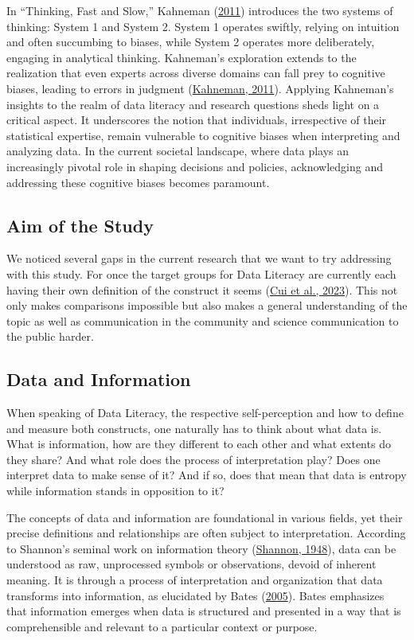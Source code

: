\documentclass[
  12pt,
  a4paper,
  twoside]{article}
\begin{document}
In ``Thinking, Fast and Slow,'' Kahneman (\protect\hyperlink{ref-kahneman2011}{2011}) introduces the two systems of thinking: System 1 and System 2. System 1 operates swiftly, relying on intuition and often succumbing to biases, while System 2 operates more deliberately, engaging in analytical thinking. Kahneman's exploration extends to the realization that even experts across diverse domains can fall prey to cognitive biases, leading to errors in judgment (\protect\hyperlink{ref-kahneman2011}{Kahneman, 2011}).
Applying Kahneman's insights to the realm of data literacy and research questions sheds light on a critical aspect. It underscores the notion that individuals, irrespective of their statistical expertise, remain vulnerable to cognitive biases when interpreting and analyzing data. In the current societal landscape, where data plays an increasingly pivotal role in shaping decisions and policies, acknowledging and addressing these cognitive biases becomes paramount.

\hypertarget{aim-of-the-study}{%
\subsection{Aim of the Study}\label{aim-of-the-study}}

We noticed several gaps in the current research that we want to try addressing with this study. For once the target groups for Data Literacy are currently each having their own definition of the construct it seems (\protect\hyperlink{ref-Cui2023}{Cui et al., 2023}). This not only makes comparisons impossible but also makes a general understanding of the topic as well as communication in the community and science communication to the public harder.

\hypertarget{data-and-information}{%
\subsection{Data and Information}\label{data-and-information}}

When speaking of Data Literacy, the respective self-perception and how to define and measure both constructs, one naturally has to think about what data is. What is information, how are they different to each other and what extents do they share? And what role does the process of interpretation play? Does one interpret data to make sense of it? And if so, does that mean that data is entropy while information stands in opposition to it?

The concepts of data and information are foundational in various fields, yet their precise definitions and relationships are often subject to interpretation.
According to Shannon's seminal work on information theory (\protect\hyperlink{ref-shannon1948}{Shannon, 1948}), data can be understood as raw, unprocessed symbols or observations, devoid of inherent meaning. It is through a process of interpretation and organization that data transforms into information, as elucidated by Bates (\protect\hyperlink{ref-bates2005}{2005}). Bates emphasizes that information emerges when data is structured and presented in a way that is comprehensible and relevant to a particular context or purpose.
\end{document}
